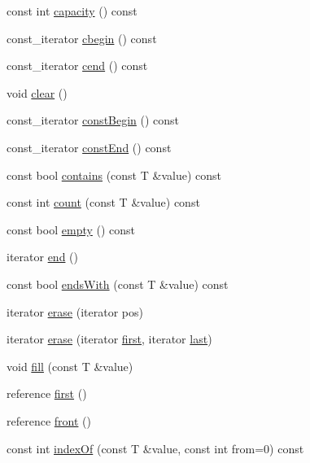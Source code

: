 \begin{DoxyCompactItemize}
const int \hyperlink{namespaceprism_1_1aux_a69b79e5620215d2439c5f35cc2a945fe}{capacity} () const 
\item 
const\+\_\+iterator \hyperlink{namespaceprism_1_1aux_a0ad8a6ad4b9b8416c05fdee349208d4c}{cbegin} () const 
\item 
const\+\_\+iterator \hyperlink{namespaceprism_1_1aux_ad6206fca04277236c2d6edd497c2bf22}{cend} () const 
\item 
void \hyperlink{namespaceprism_1_1aux_af9dfe6df22b5b28d81a024a6bbc319c3}{clear} ()
\item 
const\+\_\+iterator \hyperlink{namespaceprism_1_1aux_a759427246ea193f15c34088ed1bc56db}{const\+Begin} () const 
\item 
const\+\_\+iterator \hyperlink{namespaceprism_1_1aux_aaaf4b387a907a2c27c35328a68956991}{const\+End} () const 
\item 
const bool \hyperlink{namespaceprism_1_1aux_a4e0c925fe7f93dd8533f7b9ed6d6ab0f}{contains} (const T \&value) const 
\item 
const int \hyperlink{namespaceprism_1_1aux_a14e4de22b19399e53423b408f624d866}{count} (const T \&value) const 
\item 
const bool \hyperlink{namespaceprism_1_1aux_a83f1998dde2fd622124b8e727e19e143}{empty} () const 
\item 
iterator \hyperlink{namespaceprism_1_1aux_a335f8dc9d05813c1eb69233ed66eea3d}{end} ()
\item 
const bool \hyperlink{namespaceprism_1_1aux_ad7f19ac06a01a1831a83c94c3d5633bc}{ends\+With} (const T \&value) const 
\item 
iterator \hyperlink{namespaceprism_1_1aux_ab57a97c10c7ffe497544eabb5819c236}{erase} (iterator pos)
\item 
iterator \hyperlink{namespaceprism_1_1aux_a014ff705700f2d842f1be0546bc30875}{erase} (iterator \hyperlink{namespaceprism_1_1aux_a16674f8b7bafe0844292be51e17dafa1}{first}, iterator \hyperlink{namespaceprism_1_1aux_a23a89c64fd9ee1f27799fe56c943a44d}{last})
\item 
void \hyperlink{namespaceprism_1_1aux_a3bd81ac98dc51b1741262ae9bcddf1e0}{fill} (const T \&value)
\item 
reference \hyperlink{namespaceprism_1_1aux_a16674f8b7bafe0844292be51e17dafa1}{first} ()
\item 
reference \hyperlink{namespaceprism_1_1aux_a072486b8ada0a0e862b2db17dc78b218}{front} ()
\item 
const int \hyperlink{namespaceprism_1_1aux_a568249f1a464820e237a2e60d5e8b6a2}{index\+Of} (const T \&value, const int from=0) const 

\end{DoxyCompactItemize}
